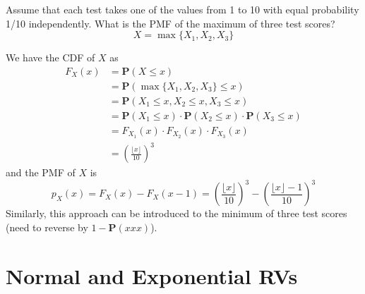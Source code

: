 \begin{example}
    Assume that each test takes one of the values from 1 to 10 with equal probability 1/10 independently. What is the PMF of the maximum of three test scores?
    \begin{equation}
        X = \max\{X_1, X_2, X_3\}
    \end{equation}
    \begin{solution}
        We have the CDF of $X$ as
        \begin{equation}
        \begin{aligned}
            F_{X}(x) &= \mathbf{P}(X \leq x) \\ 
            &= \mathbf{P}(\max\{X_1, X_2, X_3\} \leq x) \\ 
            &= \mathbf{P}(X_1 \leq x, X_2 \leq x, X_3 \leq x) \\ 
            &= \mathbf{P}(X_1 \leq x) \cdot \mathbf{P}(X_2 \leq x) \cdot \mathbf{P}(X_3 \leq x) \\
            &= F_{X_1}(x) \cdot F_{X_2}(x) \cdot F_{X_3}(x) \\ 
            &= \left(\frac{\lfloor x \rfloor}{10}\right)^3
        \end{aligned}
        \end{equation}
        and the PMF of $X$ is
        \begin{equation}
            p_{X}(x) = F_{X}(x) - F_{X}(x - 1) = \left(\frac{\lfloor x \rfloor}{10}\right)^3 - \left(\frac{\lfloor x \rfloor - 1}{10}\right)^3
        \end{equation}
        Similarly, this approach can be introduced to the minimum of three test scores (need to reverse by $1 - \mathbf{P}(xxx)$).
    \end{solution}
\end{example}


\section{Normal and Exponential RVs}

